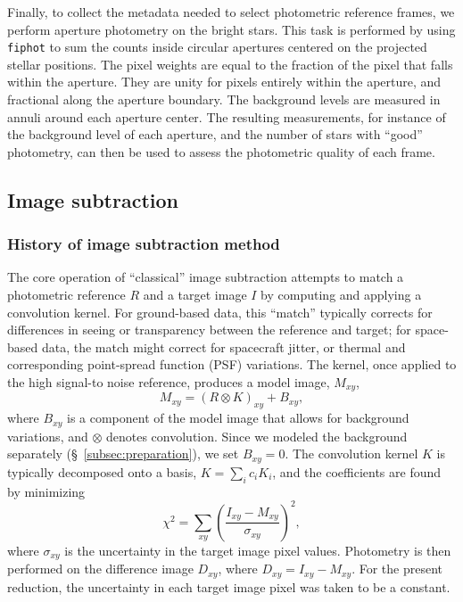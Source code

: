 \documentclass[12pt,twocolumn,tighten]{aastex62}
\begin{document}
Finally, to collect the metadata needed
to select photometric reference frames,
we perform
aperture photometry on the
bright stars.
This task is
performed by using \texttt{fiphot} to
sum the counts inside 
circular apertures centered on the projected stellar positions.
The pixel weights are equal to the fraction of the pixel
that falls within the aperture.  They are unity for pixels
entirely within the aperture, and fractional along the aperture
boundary. %
The background levels are measured in annuli around each aperture
center. 
The resulting measurements, for instance of the background level of
each aperture, and the number of stars with ``good'' photometry,
can then be used to assess the photometric quality of each frame.


\subsection{Image subtraction}
\label{subsec:imagesubtraction}

\subsubsection{History of image subtraction method}

The core operation of ``classical'' image subtraction attempts to
match a photometric reference $R$ and a target image $I$ by computing
and applying a convolution kernel.  For ground-based data, this
``match'' typically corrects for differences in seeing or transparency
between the reference and target; for space-based data, the match
might correct for spacecraft jitter, or thermal and corresponding
point-spread function (PSF) variations.  The kernel, once applied to
the high signal-to noise reference, produces a model image, $M_{xy}$,
\begin{equation}
    M_{xy} = (R \otimes K)_{xy} + B_{xy},
    \label{eq:imagemodel}
\end{equation}
where $B_{xy}$ is a component of the model image that allows for
background variations, and $\otimes$ denotes convolution.  Since we
modeled the background separately (\S~\ref{subsec:preparation}), we
set $B_{xy}=0$.  The convolution kernel $K$ is typically decomposed
onto a basis, $K = \sum_i c_i K_i$, and the coefficients are found by
minimizing
\begin{equation}
    \chi^2 = \sum_{xy} \left( \frac{I_{xy} - M_{xy}}{\sigma_{xy}} \right)^2,
    \label{eq:chisq_conv}
\end{equation}
where $\sigma_{xy}$ is the uncertainty in the target image pixel
values.  Photometry is then performed on the difference image
$D_{xy}$, where $D_{xy} = I_{xy} - M_{xy}$.  For the present
reduction, the uncertainty in each target image pixel was taken to be
a constant.	
\end{document}
